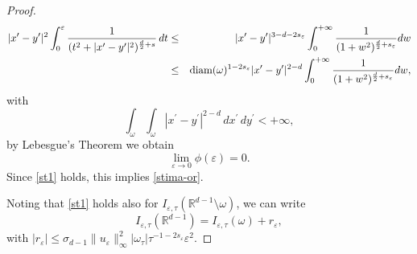 \documentclass[10pt,a4paper]{amsart}
\def\e{\varepsilon}
\begin{document}
\begin{proof}
\begin{eqnarray*}
|x^\prime-y^\prime|^2\int_0^\e\frac{1}{(t^2+|x^\prime-y^\prime|^2)^{\frac{d}{2}+s}}\, dt
&\leq&|x^\prime-y^\prime|^{3-d-2s_\e} \int_0^{+\infty}\frac{1}{(1+w^2)^{\frac{d}{2}+s_\e}} d w \\
&\leq&\hbox{\rm diam}(\omega)^{1-2s_\e} |x^\prime-y^\prime|^{2-d}\int_0^{+\infty}\frac{1}{(1+w^2)^{\frac{d}{2}+s_\e}} d w, 
\end{eqnarray*}
with
$$\int_{\omega}\int_{\omega}|x^\prime-y^\prime|^{2-d}\, dx^\prime\, dy^\prime<+\infty,$$ 
by Lebesgue's Theorem we obtain 
$$\lim_{\e\to 0}\phi(\e)=0.$$
Since \eqref{st1} holds, this implies \eqref{stima-or}.

Noting that \eqref{st1} holds also for $I_{\e,\tau}(\mathbb R^{d-1}\setminus\omega)$, we can write
\begin{equation}\label{stima-semi}
I_{\e,\tau}(\mathbb R^{d-1})
= I_{\e,\tau}(\omega)+r_\e, 
\end{equation}
with $|r_\e|\leq \sigma_{d-1}\|u_\e\|^2_\infty |\omega_\tau|\tau^{-1-2s_\e}\e^2$. 


\end{proof}
\end{document}
